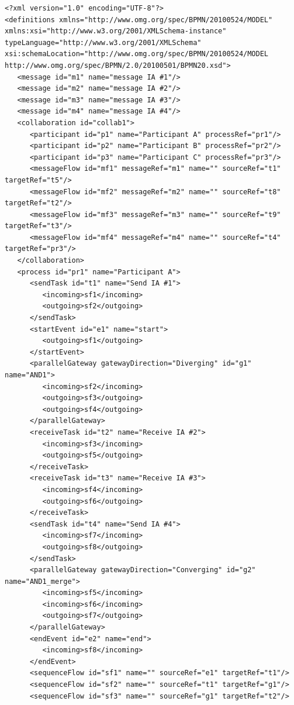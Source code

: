 \begin{lstlisting}[caption={BPMN Choreography Model Example},captionpos=b, label={lst:collabbpmnex}]
<?xml version="1.0" encoding="UTF-8"?>
<definitions xmlns="http://www.omg.org/spec/BPMN/20100524/MODEL" xmlns:xsi="http://www.w3.org/2001/XMLSchema-instance" typeLanguage="http://www.w3.org/2001/XMLSchema" xsi:schemaLocation="http://www.omg.org/spec/BPMN/20100524/MODEL http://www.omg.org/spec/BPMN/2.0/20100501/BPMN20.xsd">
   <message id="m1" name="message IA #1"/>
   <message id="m2" name="message IA #2"/>
   <message id="m3" name="message IA #3"/>
   <message id="m4" name="message IA #4"/>
   <collaboration id="collab1">
      <participant id="p1" name="Participant A" processRef="pr1"/>
      <participant id="p2" name="Participant B" processRef="pr2"/>
      <participant id="p3" name="Participant C" processRef="pr3"/>
      <messageFlow id="mf1" messageRef="m1" name="" sourceRef="t1" targetRef="t5"/>
      <messageFlow id="mf2" messageRef="m2" name="" sourceRef="t8" targetRef="t2"/>
      <messageFlow id="mf3" messageRef="m3" name="" sourceRef="t9" targetRef="t3"/>
      <messageFlow id="mf4" messageRef="m4" name="" sourceRef="t4" targetRef="pr3"/>
   </collaboration>
   <process id="pr1" name="Participant A">
      <sendTask id="t1" name="Send IA #1">
         <incoming>sf1</incoming>
         <outgoing>sf2</outgoing>
      </sendTask>
      <startEvent id="e1" name="start">
         <outgoing>sf1</outgoing>
      </startEvent>
      <parallelGateway gatewayDirection="Diverging" id="g1" name="AND1">
         <incoming>sf2</incoming>
         <outgoing>sf3</outgoing>
         <outgoing>sf4</outgoing>
      </parallelGateway>
      <receiveTask id="t2" name="Receive IA #2">
         <incoming>sf3</incoming>
         <outgoing>sf5</outgoing>
      </receiveTask>
      <receiveTask id="t3" name="Receive IA #3">
         <incoming>sf4</incoming>
         <outgoing>sf6</outgoing>
      </receiveTask>
      <sendTask id="t4" name="Send IA #4">
         <incoming>sf7</incoming>
         <outgoing>sf8</outgoing>
      </sendTask>
      <parallelGateway gatewayDirection="Converging" id="g2" name="AND1_merge">
         <incoming>sf5</incoming>
         <incoming>sf6</incoming>
         <outgoing>sf7</outgoing>
      </parallelGateway>
      <endEvent id="e2" name="end">
         <incoming>sf8</incoming>
      </endEvent>
      <sequenceFlow id="sf1" name="" sourceRef="e1" targetRef="t1"/>
      <sequenceFlow id="sf2" name="" sourceRef="t1" targetRef="g1"/>
      <sequenceFlow id="sf3" name="" sourceRef="g1" targetRef="t2"/>

\end{lstlisting}
